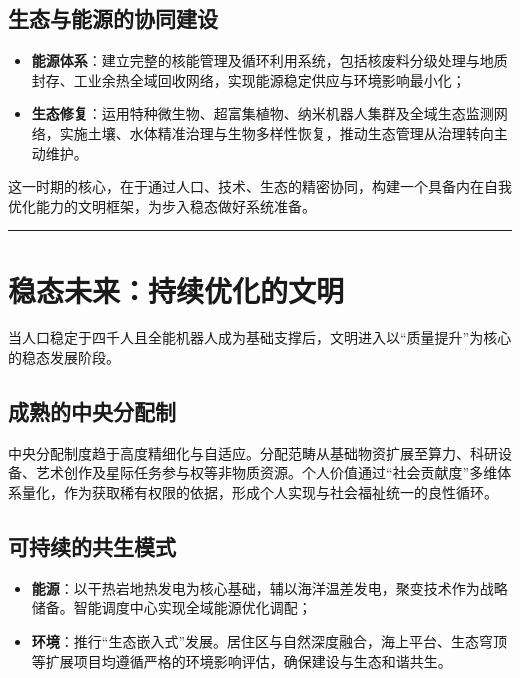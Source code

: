 \subsection{生态与能源的协同建设}\label{ux751fux6001ux4e0eux80fdux6e90ux7684ux534fux540cux5efaux8bbe}

\begin{itemize}
\tightlist
\item
  \textbf{能源体系}：建立完整的核能管理及循环利用系统，包括核废料分级处理与地质封存、工业余热全域回收网络，实现能源稳定供应与环境影响最小化；
\item
  \textbf{生态修复}：运用特种微生物、超富集植物、纳米机器人集群及全域生态监测网络，实施土壤、水体精准治理与生物多样性恢复，推动生态管理从治理转向主动维护。
\end{itemize}

这一时期的核心，在于通过人口、技术、生态的精密协同，构建一个具备内在自我优化能力的文明框架，为步入稳态做好系统准备。

\begin{center}\rule{0.5\linewidth}{0.5pt}\end{center}

\section{稳态未来：持续优化的文明}\label{ux7a33ux6001ux672aux6765ux6301ux7eedux4f18ux5316ux7684ux6587ux660e}

当人口稳定于四千人且全能机器人成为基础支撑后，文明进入以``质量提升''为核心的稳态发展阶段。

\subsection{成熟的中央分配制}\label{ux6210ux719fux7684ux4e2dux592eux5206ux914dux5236}

中央分配制度趋于高度精细化与自适应。分配范畴从基础物资扩展至算力、科研设备、艺术创作及星际任务参与权等非物质资源。个人价值通过``社会贡献度''多维体系量化，作为获取稀有权限的依据，形成个人实现与社会福祉统一的良性循环。

\subsection{可持续的共生模式}\label{ux53efux6301ux7eedux7684ux5171ux751fux6a21ux5f0f}

\begin{itemize}
\tightlist
\item
  \textbf{能源}：以干热岩地热发电为核心基础，辅以海洋温差发电，聚变技术作为战略储备。智能调度中心实现全域能源优化调配；
\item
  \textbf{环境}：推行``生态嵌入式''发展。居住区与自然深度融合，海上平台、生态穹顶等扩展项目均遵循严格的环境影响评估，确保建设与生态和谐共生。
\end{itemize}

